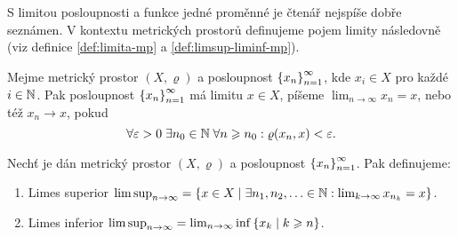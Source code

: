 S limitou posloupnosti a funkce jedné proměnné je čtenář nejspíše dobře seznámen. V kontextu metrických prostorů definujeme pojem limity následovně (viz definice \ref{def:limita-mp} a \ref{def:limsup-liminf-mp}).
\begin{definition}\label{def:limita-mp}
    Mejme metrický prostor $(X,\varrho)$ a posloupnost $\left\{x_n\right\}_{n=1}^\infty$, kde $x_i\in X$ pro každé $i\in\mathbb{N}$. Pak posloupnost $\left\{x_n\right\}_{n=1}^\infty$ má limitu $x\in X$, píšeme $\lim_{n\to\infty}x_n=x$, nebo též $x_n\to x$, pokud
    \[\forall\varepsilon>0\;\exists n_0\in\mathbb{N}\;\forall n\geqslant n_0: \varrho(x_n,x)<\varepsilon.\]
\end{definition}
\begin{definition}\label{def:limsup-liminf-mp}
    Nechť je dán metrický prostor $(X,\varrho)$ a posloupnost $\left\{x_n\right\}_{n=1}^\infty$. Pak definujeme:
    \begin{enumerate}[label=(\alph*)]
        \item Limes superior $\limsup_{n\to\infty}=\left\{x\in X\mid \exists n_1,n_2,\ldots\in\mathbb{N}: \lim_{k\to\infty}x_{n_k}=x\right\}$.
        \item Limes inferior $\limsup_{n\to\infty}=\lim_{n\to\infty}\inf\left\{x_k\mid k\geqslant n\right\}$.
    \end{enumerate}
\end{definition}

